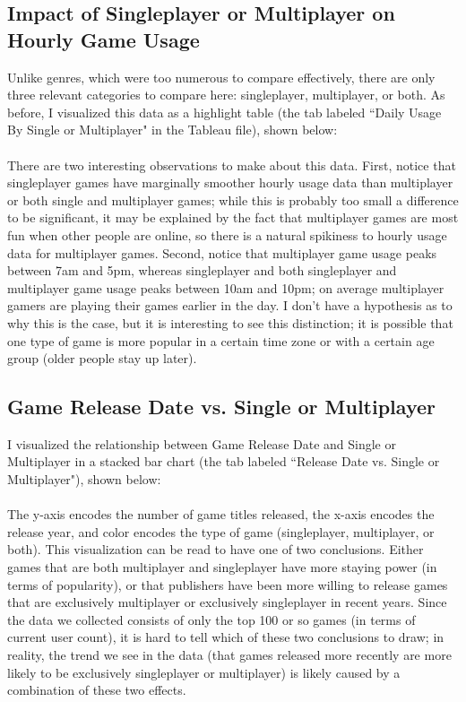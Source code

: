 \documentclass[pdftex,12pt,a4paper]{article}
\begin{document}
\subsection{Impact of Singleplayer or Multiplayer on Hourly Game Usage}
Unlike genres, which were too numerous to compare effectively, there are only three relevant categories to compare here: singleplayer, multiplayer, or both. As before, I visualized this data as a highlight table (the tab labeled ``Daily Usage By Single or Multiplayer" in the Tableau file), shown below: \\ \\

There are two interesting observations to make about this data. First, notice that singleplayer games have marginally smoother hourly usage data than multiplayer or both single and multiplayer games; while this is probably too small a difference to be significant, it may be explained by the fact that multiplayer games are most fun when other people are online, so there is a natural spikiness to hourly usage data for multiplayer games. Second, notice that multiplayer game usage peaks between 7am and 5pm, whereas singleplayer and both singleplayer and multiplayer game usage peaks between 10am and 10pm; on average multiplayer gamers are playing their games earlier in the day. I don't have a hypothesis as to why this is the case, but it is interesting to see this distinction; it is possible that one type of game is more popular in a certain time zone or with a certain age group (older people stay up later). 

\subsection{Game Release Date vs. Single or Multiplayer}
I visualized the relationship between Game Release Date and Single or Multiplayer in a stacked bar chart (the tab labeled ``Release Date vs. Single or Multiplayer"), shown below: \\ \\

The y-axis encodes the number of game titles released, the x-axis encodes the release year, and color encodes the type of game (singleplayer, multiplayer, or both). This visualization can be read to have one of two conclusions. Either games that are both multiplayer and singleplayer have more staying power (in terms of popularity), or that publishers have been more willing to release games that are exclusively multiplayer or exclusively singleplayer in recent years. Since the data we collected consists of only the top 100 or so games (in terms of current user count), it is hard to tell which of these two conclusions to draw; in reality, the trend we see in the data (that games released more recently are more likely to be exclusively singleplayer or multiplayer) is likely caused by a combination of these two effects.
\end{document}
